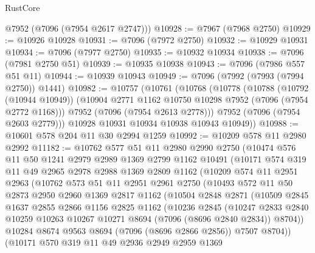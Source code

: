 \begin{lexlean}{RustCore}
\begin{coremodule}
      @7952
      (@7096 (@7954 @2617 @2747)))
@10928 := @7967 (@7968 @2750)
@10929 := @10926 @10928
@10931 := @7096 (@7972 @2750)
@10932 := @10929 @10931
@10934 := @7096 (@7977 @2750)
@10935 := @10932 @10934
@10938 := @7096 (@7981 @2750 @51)
@10939 := @10935 @10938
@10943 := @7096 (@7986 @557 @51 @11)
@10944 := @10939 @10943
@10949 := @7096 (@7992 (@7993 (@7994 @2750)) @1441)
@10982 := @10757
    (@10761
      (@10768
        (@10778
          (@10788
            (@10792 (@10944 @10949))
            (@10904 @2771 @1162 @10750 @10298 @7952 (@7096 (@7954 @2772 @1168)))
            @7952
            (@7096 (@7954 @2613 @2778)))
          @7952
          (@7096 (@7954 @2603 @2779)))
        @10928
        @10931
        @10934
        @10938
        @10943
        @10949))
@10988 := @10601 @578 @204 @11 @30 @2994 @1259
@10992 := @10209 @578 @11 @2980 @2992
@11182 := @10762
    @577
    @51
    @11
    @2980
    @2990
    @2750
    (@10474
      @576
      @11
      @50
      @1241
      @2979
      @2989
      @1369
      @2799
      @1162
      @10491
      (@10171
        @574
        @319
        @11
        @49
        @2965
        @2978
        @2988
        @1369
        @2809
        @1162
        (@10209
          @574
          @11
          @2951
          @2963
          (@10762
            @573
            @51
            @11
            @2951
            @2961
            @2750
            (@10493
              @572
              @11
              @50
              @2873
              @2950
              @2960
              @1369
              @2817
              @1162
              (@10504
                @2848
                @2871
                (@10509
                  @2845
                  @1637
                  @2855
                  @2866
                  @1156
                  @2825
                  @1162
                  (@10236
                    @2845
                    (@10247
                      @2833
                      @2840
                      @10259
                      @10263
                      @10267
                      @10271
                      @8694
                      (@7096 (@8696 @2840 @2834))
                      @8704))
                  @10284
                  @8674
                  @9563
                  @8694
                  (@7096 (@8696 @2866 @2856))
                  @7507
                  @8704))
              (@10171
                @570
                @319
                @11
                @49
                @2936
                @2949
                @2959
                @1369

\end{coremodule}
\end{lexlean}
